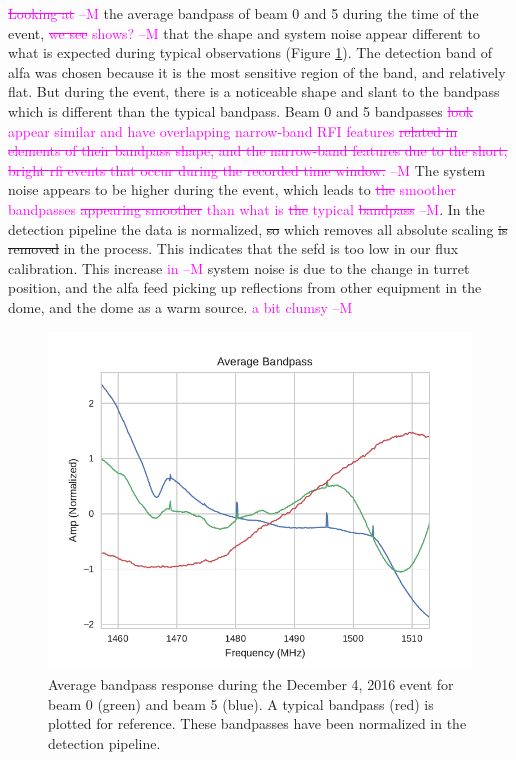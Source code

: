 \documentclass[a4paper,fleqn,usenatbib]{mnras}
\newcommand{\cM}[1]{\textcolor{magenta}{ #1 --M}}
\begin{document}
\cM{\sout{Looking at}} the average bandpass of beam 0 and 5 during the time of the event, \cM{\sout{we
see} shows?} that the shape and system noise appear different to what is expected during
typical observations (Figure \ref{fig:bandpass_response}).  The detection band
of \gls{alfa} was chosen because it is the most sensitive region of the band,
and relatively flat. But during the event, there is a noticeable shape and slant
to the bandpass which is different than the typical bandpass.  Beam 0 and 5
bandpasses \cM{\sout{look} appear similar and have overlapping narrow-band RFI features \sout{related in elements of their bandpass shape, and the narrow-band
features due to the short, bright \gls{rfi} events that occur during the
recorded time window.}} The system noise appears to be higher during the event,
which leads to \cM{\sout{the} smoother bandpasses \sout{appearing smoother} than what is \sout{the} typical \sout{bandpass}}.  In
the detection pipeline the data is normalized, \sout{so} which removes all absolute scaling \sout{is
removed} in the process. This indicates that the \gls{sefd} is too low in our
flux calibration. This increase \cM{in} system noise is due to the change in turret
position, and the \gls{alfa} feed picking up reflections from other equipment in
the dome, and the dome as a warm source. \cM{a bit clumsy}

\begin{figure}
    \includegraphics[width=1.0\linewidth]{figures/bandpass_response.pdf}
    \caption{Average bandpass response during the December 4, 2016 event for beam
    0 (green) and beam 5 (blue). A typical bandpass (red) is plotted for
    reference. These bandpasses have been normalized in the detection pipeline.
    }
    \label{fig:bandpass_response}
\end{figure}
\end{document}
